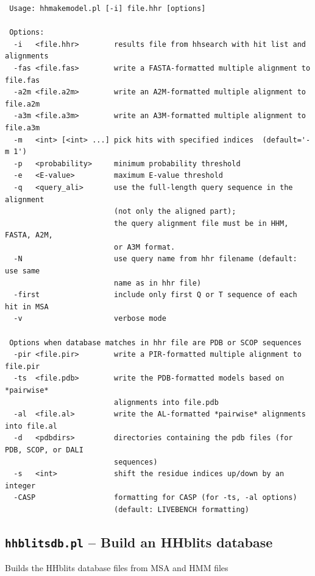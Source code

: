 \documentclass[11pt,a4paper]{article}
\begin{document}
\small 
\begin{verbatim}
 Usage: hhmakemodel.pl [-i] file.hhr [options]

 Options:
  -i   <file.hhr>        results file from hhsearch with hit list and alignments
  -fas <file.fas>        write a FASTA-formatted multiple alignment to file.fas
  -a2m <file.a2m>        write an A2M-formatted multiple alignment to file.a2m
  -a3m <file.a3m>        write an A3M-formatted multiple alignment to file.a3m
  -m   <int> [<int> ...] pick hits with specified indices  (default='-m 1')
  -p   <probability>     minimum probability threshold     
  -e   <E-value>         maximum E-value threshold      
  -q   <query_ali>       use the full-length query sequence in the alignment 
                         (not only the aligned part);
                         the query alignment file must be in HHM, FASTA, A2M,  
                         or A3M format.
  -N                     use query name from hhr filename (default: use same  
                         name as in hhr file)
  -first                 include only first Q or T sequence of each hit in MSA
  -v                     verbose mode

 Options when database matches in hhr file are PDB or SCOP sequences
  -pir <file.pir>        write a PIR-formatted multiple alignment to file.pir 
  -ts  <file.pdb>        write the PDB-formatted models based on *pairwise*  
                         alignments into file.pdb
  -al  <file.al>         write the AL-formatted *pairwise* alignments into file.al
  -d   <pdbdirs>         directories containing the pdb files (for PDB, SCOP, or DALI  
                         sequences)
  -s   <int>             shift the residue indices up/down by an integer           
  -CASP                  formatting for CASP (for -ts, -al options) 
                         (default: LIVEBENCH formatting)
\end{verbatim} 
\normalsize


\subsection{{\tt hhblitsdb.pl} -- Build an HHblits database }

Builds the HHblits database files from MSA and HMM files 
\end{document}
